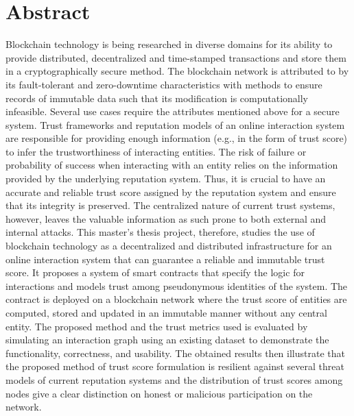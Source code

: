 \chapter*{Abstract}
Blockchain technology is being researched in diverse domains for its ability to
provide distributed, decentralized and time-stamped transactions and store them
in a cryptographically secure method. The blockchain network is attributed to
by its fault-tolerant and zero-downtime characteristics with methods to ensure
records of immutable data such that its modification is computationally
infeasible. Several use cases require the attributes mentioned above for a
secure system. Trust frameworks and reputation models of an online interaction
system are responsible for providing enough information (e.g., in the form of
trust score) to infer the trustworthiness of interacting entities. The risk of
failure or probability of success when interacting with an entity relies on the
information provided by the underlying reputation system. Thus, it is crucial
to have an accurate and reliable trust score assigned by the reputation system
and ensure that its integrity is preserved. The centralized nature of current
trust systems, however, leaves the valuable information as such prone to both
external and internal attacks. This master's thesis project, therefore, studies
the use of blockchain technology as a decentralized and distributed
infrastructure for an online interaction system that can guarantee a reliable
and immutable trust score. It proposes a system of smart contracts that specify
the logic for interactions and models trust among pseudonymous identities of
the system. The contract is deployed on a blockchain network where the trust
score of entities are computed, stored and updated in an immutable manner
without any central entity. The proposed method and the trust metrics used is
evaluated by simulating an interaction graph using an existing dataset to
demonstrate the functionality, correctness, and usability. The obtained results
then illustrate that the proposed method of trust score formulation is
resilient against several threat models of current reputation systems and the
distribution of trust scores among nodes give a clear distinction on honest or
malicious participation on the network.

